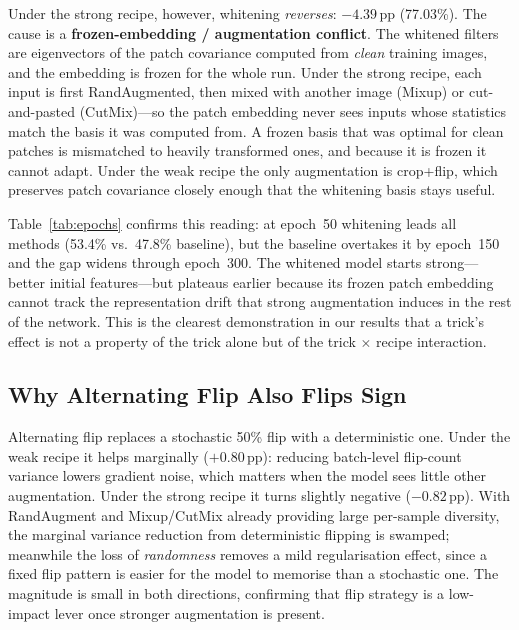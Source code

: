 \documentclass[10pt,twocolumn]{article}
\newcommand{\pp}{\,pp}   %
\begin{document}
Under the strong recipe, however, whitening \emph{reverses}: $-4.39$\pp{} (77.03\%).
The cause is a \textbf{frozen-embedding / augmentation conflict}.
The whitened filters are eigenvectors of the patch covariance computed from \emph{clean} training images, and the embedding is frozen for the whole run.
Under the strong recipe, each input is first RandAugmented, then mixed with another image (Mixup) or cut-and-pasted (CutMix)---so the patch embedding never sees inputs whose statistics match the basis it was computed from.
A frozen basis that was optimal for clean patches is mismatched to heavily transformed ones, and because it is frozen it cannot adapt.
Under the weak recipe the only augmentation is crop+flip, which preserves patch covariance closely enough that the whitening basis stays useful.

Table~\ref{tab:epochs} confirms this reading: at epoch~50 whitening leads all methods (53.4\% vs.\ 47.8\% baseline), but the baseline overtakes it by epoch~150 and the gap widens through epoch~300.
The whitened model starts strong---better initial features---but plateaus earlier because its frozen patch embedding cannot track the representation drift that strong augmentation induces in the rest of the network.
This is the clearest demonstration in our results that a trick's effect is not a property of the trick alone but of the trick $\times$ recipe interaction.

\subsection{Why Alternating Flip Also Flips Sign}
Alternating flip replaces a stochastic 50\% flip with a deterministic one.
Under the weak recipe it helps marginally ($+0.80$\pp{}): reducing batch-level flip-count variance lowers gradient noise, which matters when the model sees little other augmentation.
Under the strong recipe it turns slightly negative ($-0.82$\pp{}).
With RandAugment and Mixup/CutMix already providing large per-sample diversity, the marginal variance reduction from deterministic flipping is swamped; meanwhile the loss of \emph{randomness} removes a mild regularisation effect, since a fixed flip pattern is easier for the model to memorise than a stochastic one.
The magnitude is small in both directions, confirming that flip strategy is a low-impact lever once stronger augmentation is present.
\end{document}
